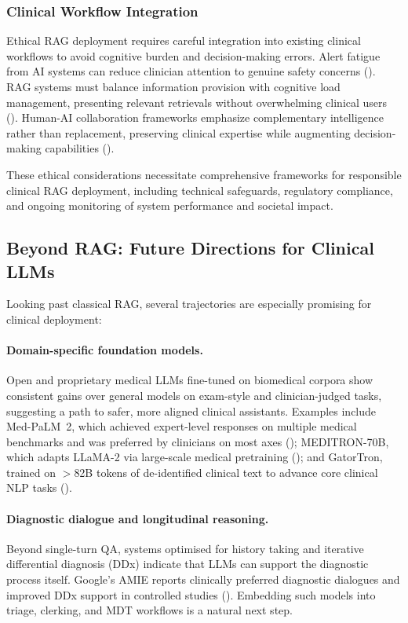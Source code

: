 \subsubsection{Clinical Workflow Integration}
Ethical RAG deployment requires careful integration into existing clinical workflows to avoid cognitive burden and decision-making errors. Alert fatigue from AI systems can reduce clinician attention to genuine safety concerns (\citep{ancker2017effects}). RAG systems must balance information provision with cognitive load management, presenting relevant retrievals without overwhelming clinical users (\citep{bates2003reducing}). Human-AI collaboration frameworks emphasize complementary intelligence rather than replacement, preserving clinical expertise while augmenting decision-making capabilities (\citep{rajkomar2019machine}).

These ethical considerations necessitate comprehensive frameworks for responsible clinical RAG deployment, including technical safeguards, regulatory compliance, and ongoing monitoring of system performance and societal impact.

\subsection{Beyond RAG: Future Directions for Clinical LLMs}

Looking past classical RAG, several trajectories are especially promising for clinical deployment:

\paragraph{Domain-specific foundation models.}
Open and proprietary medical LLMs fine-tuned on biomedical corpora show consistent gains over general models on exam-style and clinician-judged tasks, suggesting a path to safer, more aligned clinical assistants. Examples include Med-PaLM~2, which achieved expert-level responses on multiple medical benchmarks and was preferred by clinicians on most axes (\citep{singhal2024medpalm2}); MEDITRON-70B, which adapts LLaMA-2 via large-scale medical pretraining (\citep{chen2023meditron}); and GatorTron, trained on $>$82B tokens of de-identified clinical text to advance core clinical NLP tasks (\citep{yang2022gatortron}).

\paragraph{Diagnostic dialogue and longitudinal reasoning.}
Beyond single-turn QA, systems optimised for history taking and iterative differential diagnosis (DDx) indicate that LLMs can support the diagnostic process itself. Google's AMIE reports clinically preferred diagnostic dialogues and improved DDx support in controlled studies (\citep{amie2025nature,amie2024blog}). Embedding such models into triage, clerking, and MDT workflows is a natural next step.

